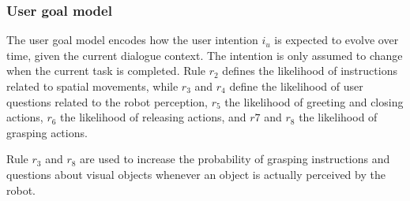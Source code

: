 \subsubsection*{User goal model}

The user goal model encodes how the user intention $i_u$ is expected to evolve over time, given the current dialogue context.  The intention is only assumed to change when the current task is completed. Rule $r_2$ defines the likelihood of instructions related to spatial movements, while $r_3$ and $r_4$ define the likelihood of user questions related to the robot perception, $r_5$ the likelihood of greeting and closing actions, $r_6$ the likelihood of releasing actions, and $r7$ and $r_8$ the likelihood of grasping actions.

Rule $r_3$ and $r_8$ are used to increase the probability of grasping instructions and questions about visual objects whenever an object is actually perceived by the robot.

